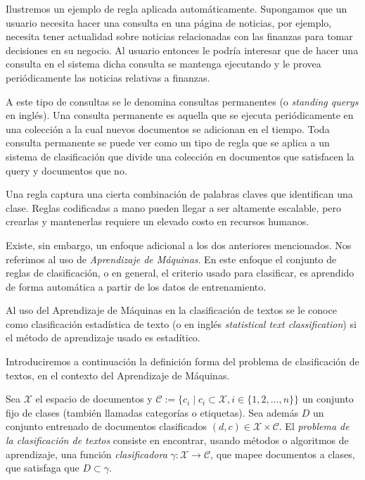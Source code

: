 \documentclass{llncs}
\begin{document}
	Ilustremos un ejemplo de regla aplicada autom\'aticamente. Supongamos que un usuario necesita hacer una consulta en una p\'agina de noticias, por ejemplo, necesita tener actualidad sobre noticias relacionadas con las finanzas para tomar decisiones en su negocio. Al usuario entonces le podr\'ia interesar que de hacer una consulta en el sistema dicha consulta se mantenga ejecutando y le provea peri\'odicamente las noticias relativas a finanzas. 
	
	A este tipo de consultas se le denomina consultas permanentes  (o \emph{standing querys} en ingl\'es). Una consulta permanente es aquella que se ejecuta peri\'odicamente en una colecci\'on a la cual nuevos  documentos se adicionan en el tiempo. Toda consulta permanente se puede ver como un tipo de regla que se aplica a un sistema de clasificaci\'on que divide una colecci\'on en documentos que satisfacen la query y documentos que no.
	
	
	
	Una regla captura una cierta combinaci\'on de palabras claves que identifican una clase. Reglas codificadas a mano pueden llegar a ser altamente escalable, pero crearlas y mantenerlas requiere un elevado costo en recursos humanos.
	
	Existe, sin embargo, un enfoque adicional a los dos anteriores mencionados. Nos referimos al uso de \emph{Aprendizaje de M\'aquinas}. En este enfoque el conjunto de reglas de clasificaci\'on, o en general, el criterio usado para clasificar, es aprendido de forma autom\'atica a partir de los datos de entrenamiento.
	
	Al uso del Aprendizaje de M\'aquinas en la clasificaci\'on de textos se le conoce como clasificaci\'on estad\'istica de texto (o en ingl\'es \emph{statistical text classification}) si el m\'etodo de aprendizaje usado es estad\'itico.
	
	Introduciremos a continuaci\'on la definici\'on forma del problema de clasificaci\'on de textos, en el contexto del Aprendizaje de M\'aquinas.
	
	\begin{definition} \label{Problema_de_clasificacion}
		Sea $\mathcal{{X}}$ el espacio de documentos y $\mathcal{C} := \{c_i \mid c_i \subset \mathcal{X}, i \in \{ 1,2,\dots,n\} \}$ un conjunto fijo de clases (tambi\'en llamadas categor\'ias o etiquetas). Sea adem\'as $D$ un conjunto entrenado de documentos clasificados $(d,c) \in \mathcal X \times \mathcal{C}$. El \emph{problema de la clasificaci\'on de textos} consiste en encontrar, usando m\'etodos o algoritmos de aprendizaje, una funci\'on \emph{clasificadora} $\gamma : \mathcal{X} \rightarrow \mathcal{C}$, que mapee documentos a clases, que satisfaga que $D \subset \gamma$. 	

	\end{definition}
	
\end{document}

